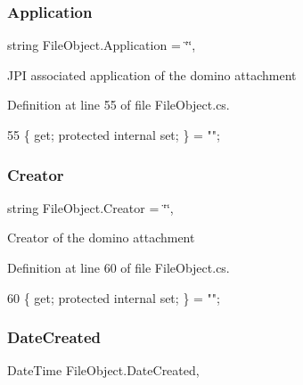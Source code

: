 \subsubsection{\texorpdfstring{Application}{Application}}
{\footnotesize\ttfamily string File\+Object.\+Application = \char`\"{}\char`\"{}\hspace{0.3cm}{\ttfamily [get]}, {\ttfamily [set]}}



J\+PI associated application of the domino attachment 



Definition at line 55 of file File\+Object.\+cs.


\begin{DoxyCode}
55 \{ \textcolor{keyword}{get}; \textcolor{keyword}{protected} \textcolor{keyword}{internal} \textcolor{keyword}{set}; \} = \textcolor{stringliteral}{""};
\end{DoxyCode}
\mbox{\label{class_file_object_a1ab7d29c80841b60b276b7430f4e5ec7}} 
\subsubsection{\texorpdfstring{Creator}{Creator}}
{\footnotesize\ttfamily string File\+Object.\+Creator = \char`\"{}\char`\"{}\hspace{0.3cm}{\ttfamily [get]}, {\ttfamily [set]}}



Creator of the domino attachment 



Definition at line 60 of file File\+Object.\+cs.


\begin{DoxyCode}
60 \{ \textcolor{keyword}{get}; \textcolor{keyword}{protected} \textcolor{keyword}{internal} \textcolor{keyword}{set}; \} = \textcolor{stringliteral}{""};
\end{DoxyCode}
\mbox{\label{class_file_object_a372b9a7dad068368526b0698550f9504}} 
\subsubsection{\texorpdfstring{Date\+Created}{DateCreated}}
{\footnotesize\ttfamily Date\+Time File\+Object.\+Date\+Created\hspace{0.3cm}{\ttfamily [get]}, {\ttfamily [set]}}



